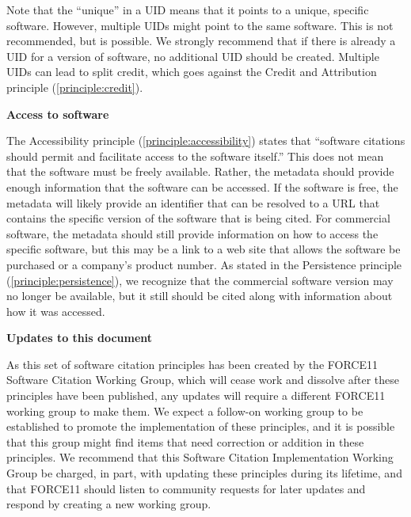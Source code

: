 \documentclass[11pt, oneside]{amsart}
\newcommand{\katznote}[1]{ {\textcolor{blue} { ***DSK: #1 }}} %
\newcommand{\LJHnote}[1]{ {\textcolor{fuschsia} { ***LJH: #1 }}} %
\begin{document}
Note that the ``unique'' in a UID means that it points to a unique, specific software. However, multiple UIDs might point to the same software.
This is not recommended, but is possible.
We strongly recommend that if there is already a UID for a version of software, no additional UID should be created.
Multiple UIDs can lead to split credit, which goes against the Credit and Attribution principle (\ref{principle:credit}).


\textbf{Access to software}

The Accessibility principle (\ref{principle:accessibility}) states that ``software citations should permit and facilitate access to the software itself.''
This does not mean that the software must be freely available.
Rather, the metadata should provide enough information that the software can be accessed.
If the software is free, the metadata will likely provide an identifier that can be resolved to a URL that contains the specific version of the software that is being cited.
For commercial software, the metadata should still provide information on how to access the specific software, but this may be a link to a web site that allows the software be purchased or a company's product number.
As stated in the Persistence principle (\ref{principle:persistence}), we recognize that the commercial software version may no longer be available, but it still should be cited along with information about how it was accessed.


%

\textbf{Updates to this document}

As this set of software citation principles has been created by the FORCE11 Software Citation Working Group, which will cease work and dissolve after these principles have been published,
any updates will require a different FORCE11 working group to make them.
We expect a follow-on working group to be established to promote the implementation of
these principles, and it is possible that this group might find items that need correction or addition
in these principles.
We recommend that this Software Citation Implementation Working Group be charged, in part,
with updating these principles during its lifetime, and that FORCE11 should listen to community requests for later updates and respond by creating a new working group.
\end{document}
